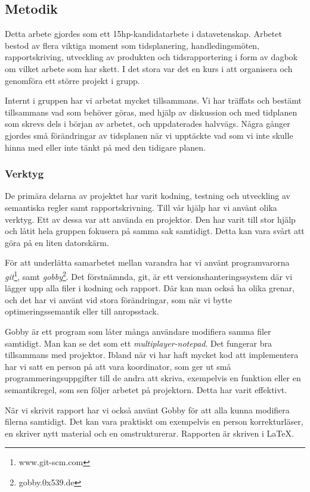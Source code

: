 \documentclass[../Appendix]{subfiles}
\begin{document}
\subsection{Metodik}

Detta arbete gjordes som ett 15hp-kandidatarbete i datavetenskap. Arbetet bestod
av flera viktiga moment som
    tidsplanering,
    handledingsmöten,
    rapportskriving,
    utveckling av produkten och
    tidsrapportering i form av dagbok om vilket arbete som har skett. I det stora
var det en kurs i att organisera och genomföra ett större projekt i grupp.


Internt i gruppen har vi arbetat mycket tillsammans. Vi har träffats och
bestämt tillsammans vad som behöver göras, med hjälp av diskussion och med
tidplanen som skrevs dels i början av arbetet, och uppdaterades halvvägs. 
Några gånger gjordes små förändringar av tidsplanen när vi upptäckte
vad som vi inte skulle hinna med eller inte tänkt på med den tidigare planen.

\subsubsection{Verktyg}

    De primära delarna av projektet har varit kodning, testning och utveckling
av semantiska regler samt rapportskrivning. Till vår hjälp har vi använt
olika verktyg. Ett av dessa var att använda en projektor. Den har varit till
stor hjälp och låtit hela gruppen fokusera på samma sak samtidigt. Detta
kan vara svårt att göra på en liten datorskärm.

    För att underlätta samarbetet mellan varandra har vi använt programvarorna
\emph{git}\footnote{www.git-scm.com}, samt \emph{gobby}\footnote{gobby.0x539.de}.
Det förstnämnda, git, är ett versionshanteringssystem där vi lägger upp alla
filer i kodning och rapport. Där kan man också ha olika grenar, och det har 
vi använt vid stora förändringar, som när vi bytte optimeringssemantik eller
till anropsstack.

    Gobby är ett program som låter många användare modifiera samma filer
samtidigt. Man kan se det som ett \emph{multiplayer-notepad}. Det fungerar bra
tillsammans med projektor. Ibland när vi har haft mycket kod att implementera
har vi satt en person på att vara koordinator, som ger ut små
programmeringsuppgifter till de andra att skriva, exempelvis en funktion eller
en semantikregel, som sen följer arbetet på projektorn. Detta har varit 
effektivt.

    När vi skrivit rapport har vi också använt Gobby för att alla kunna
modifiera filerna samtidigt. Det kan vara praktiskt om exempelvis en person
korrekturläser, en skriver nytt material och en omstrukturerar. Rapporten 
är skriven i \LaTeX.
\end{document}
